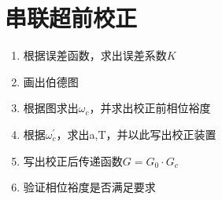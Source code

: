 \documentclass[UTF8]{ctexart}
\begin{document}
    \section{串联超前校正}

    \begin{enumerate}
        \item 根据误差函数，求出误差系数$K$
        \item 画出伯德图
        \item 根据图求出$\omega_c$，并求出校正前相位裕度
        \item 根据$\omega_c^\prime$，求出a,T，并以此写出校正装置
        \item 写出校正后传递函数$G = G_0 \cdot G_c$
        \item 验证相位裕度是否满足要求
    \end{enumerate}
\end{document}
